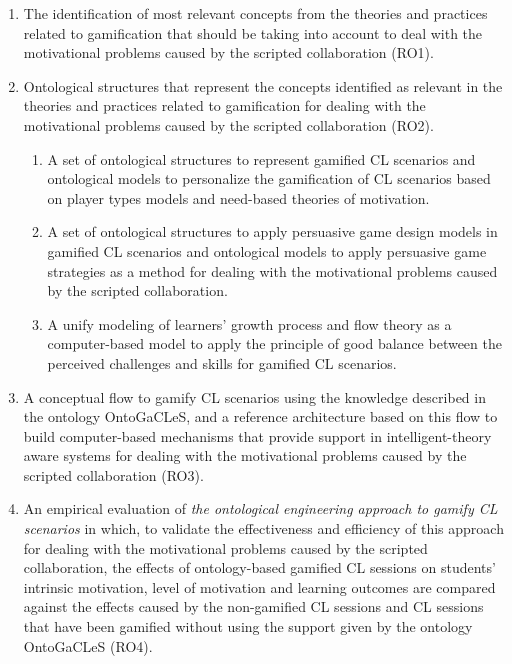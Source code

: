 \begin{enumerate}
\item 
The identification of most relevant concepts from the theories and practices related to gamification that should be taking into account to deal with the motivational problems caused by the scripted collaboration (RO1).

\item
Ontological structures that represent the concepts identified as relevant in the theories and practices related to gamification for dealing with the motivational problems caused by the scripted collaboration (RO2).

\begin{enumerate}
\item
A set of ontological structures to represent gamified CL scenarios and ontological models to personalize the gamification of CL scenarios based on player types models and need-based theories of motivation.

\item
A set of ontological structures to apply persuasive game design models in gamified CL scenarios and ontological models to apply persuasive game strategies as a method for dealing with the motivational problems caused by the scripted collaboration.

\item 
A unify modeling of learners' growth process and flow theory as a computer-based model to apply the principle of good balance between the perceived challenges and skills for gamified CL scenarios.
\end{enumerate}

\item
A conceptual flow to gamify CL scenarios using the knowledge described in the ontology OntoGaCLeS, and a reference architecture based on this flow to build computer-based mechanisms that provide support in intelligent-theory aware systems for dealing with the motivational problems caused by the scripted collaboration (RO3).

\item
An empirical evaluation of \emph{the ontological engineering approach to gamify CL scenarios} in which, to validate the effectiveness and efficiency of this approach for dealing with the motivational problems caused by the scripted collaboration, the effects of ontology-based gamified CL sessions on students' intrinsic motivation, level of motivation and learning outcomes are compared against the effects caused by the non-gamified CL sessions and CL sessions that have been gamified without using the support given by the ontology OntoGaCLeS (RO4).
\end{enumerate}

